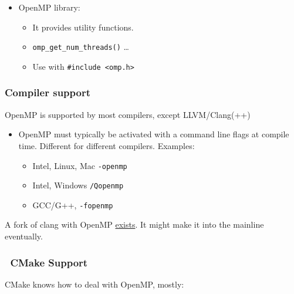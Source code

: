 \begin{itemize}
\itemsep1pt\parskip0pt
\item
  OpenMP library:

  \begin{itemize}
  \itemsep1pt\parskip0pt
  \item
    It provides utility functions.
  \item
    \texttt{omp\_get\_num\_threads()} \ldots{}
  \item
    Use with \texttt{\#include \textless{}omp.h\textgreater{}}
  \end{itemize}
\end{itemize}

\subsubsection{Compiler support}\label{compiler-support}

OpenMP is supported by most compilers, except LLVM/Clang(++)

\begin{itemize}
\itemsep1pt\parskip0pt
\item
  OpenMP must typically be activated with a command line flags at
  compile time. Different for different compilers. Examples:

  \begin{itemize}
  \itemsep1pt\parskip0pt
  \item
    Intel, Linux, Mac \texttt{-openmp}
  \item
    Intel, Windows \texttt{/Qopenmp}
  \item
    GCC/G++, \texttt{-fopenmp}
  \end{itemize}
\end{itemize}

A fork of clang with OpenMP \href{http://clang-omp.github.io/}{exists}.
It might make it into the mainline eventually.

\subsubsection{~CMake Support}\label{cmake-support}

CMake knows how to deal with OpenMP, mostly:

\begin{Shaded}
\begin{Highlighting}[]

  \NormalTok{)}
   \NormalTok{)}
\NormalTok{()}
\end{Highlighting}
\end{Shaded}

